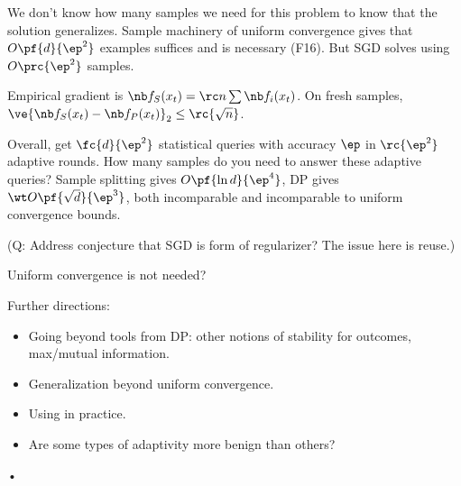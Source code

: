We don't know how many samples we need for this problem to know that the solution generalizes. Sample machinery of uniform convergence gives that $O\pf{d}{\ep^2}$ examples suffices and is necessary (F16).
But SGD solves using $O\prc{\ep^2}$ samples. 

Empirical gradient is $\nb f_S(x_t) = \rc n\sum \nb f_i(x_t)$. On fresh samples, $\ve{\nb f_S(x_t)-\nb f_P(x_t)}_2\le \rc{\sqrt n}$.

Overall, get $\fc{d}{\ep^2}$ statistical queries with accuracy $\ep$ in $\rc{\ep^2}$ adaptive rounds.
How many samples do you need to answer these adaptive queries? Sample splitting gives $O\pf{\ln d}{\ep^4}$, DP gives $\wt O\pf{\sqrt d}{\ep^3}$, both incomparable and incomparable to uniform convergence bounds.

(Q: Address conjecture that SGD is form of regularizer? The issue here is reuse.)

Uniform convergence is not needed?

Further directions:

\begin{itemize}
\item
Going beyond tools from DP: other notions of stability for outcomes, max/mutual information.
\item
Generalization beyond uniform convergence. 
\item
Using in practice.
\item
Are some types of adaptivity more benign than others? %
\end{itemize}•
